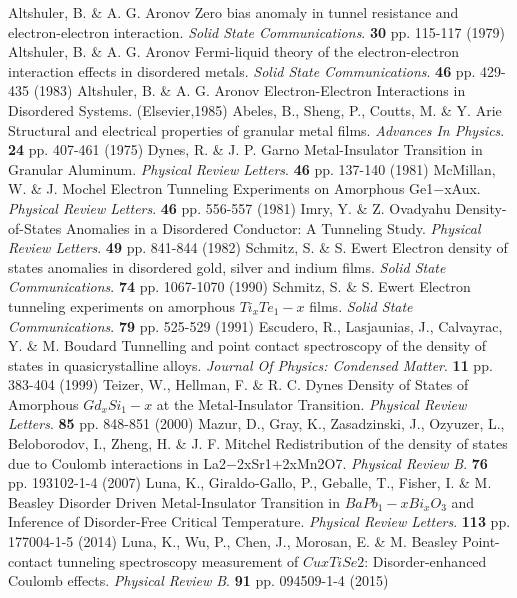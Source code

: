   \begin{thebibliography}{99}
Altshuler, B. \& A. G. Aronov Zero bias anomaly in tunnel resistance and electron-electron interaction. {\em Solid State Communications}. \textbf{30} pp. 115-117 (1979)
Altshuler, B. \& A. G. Aronov Fermi-liquid theory of the electron-electron interaction effects in disordered metals. {\em Solid State Communications}. \textbf{46} pp. 429-435 (1983)
Altshuler, B. \& A. G. Aronov Electron-Electron Interactions in Disordered Systems. (Elsevier,1985)
Abeles, B., Sheng, P., Coutts, M. \& Y. Arie Structural and electrical properties of granular metal films. {\em Advances In Physics}. \textbf{24} pp. 407-461 (1975)
Dynes, R. \& J. P. Garno Metal-Insulator Transition in Granular Aluminum. {\em Physical Review Letters}. \textbf{46} pp. 137-140 (1981)
McMillan, W. \& J. Mochel Electron Tunneling Experiments on Amorphous Ge1−xAux. {\em Physical Review Letters}. \textbf{46} pp. 556-557 (1981)
Imry, Y. \& Z. Ovadyahu Density-of-States Anomalies in a Disordered Conductor: A Tunneling Study. {\em Physical Review Letters}. \textbf{49} pp. 841-844 (1982)
Schmitz, S. \& S. Ewert Electron density of states anomalies in disordered gold, silver and indium films. {\em Solid State Communications}. \textbf{74} pp. 1067-1070 (1990)
Schmitz, S. \& S. Ewert Electron tunneling experiments on amorphous $Ti_xTe_1−x$ films. {\em Solid State Communications}. \textbf{79} pp. 525-529 (1991)
Escudero, R., Lasjaunias, J., Calvayrac, Y. \& M. Boudard Tunnelling and point contact spectroscopy of the density of states in quasicrystalline alloys. {\em Journal Of Physics: Condensed Matter}. \textbf{11} pp. 383-404 (1999)
Teizer, W., Hellman, F. \& R. C. Dynes Density of States of Amorphous $Gd_xSi_1−x$ at the Metal-Insulator Transition. {\em Physical Review Letters}. \textbf{85} pp. 848-851 (2000)
Mazur, D., Gray, K., Zasadzinski, J., Ozyuzer, L., Beloborodov, I., Zheng, H. \& J. F. Mitchel Redistribution of the density of states due to Coulomb interactions in La2−2xSr1+2xMn2O7. {\em Physical Review B}. \textbf{76} pp. 193102-1-4 (2007)
Luna, K., Giraldo-Gallo, P., Geballe, T., Fisher, I. \& M. Beasley Disorder Driven Metal-Insulator Transition in $BaPb_1−xBi_xO_3$ and Inference of Disorder-Free Critical Temperature. {\em Physical Review Letters}. \textbf{113} pp. 177004-1-5 (2014)
Luna, K., Wu, P., Chen, J., Morosan, E. \& M. Beasley Point-contact tunneling spectroscopy measurement of $CuxTiSe2$: Disorder-enhanced Coulomb effects. {\em Physical Review B}. \textbf{91} pp. 094509-1-4 (2015)

\end{thebibliography}
